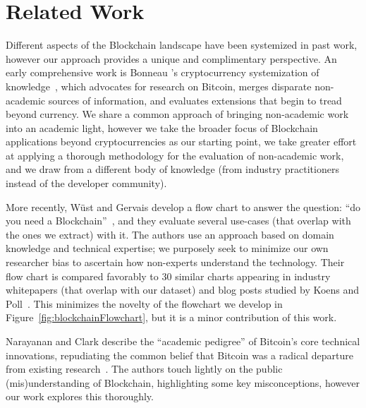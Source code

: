 
\section{Related Work}
\label{sec:related-works}

Different aspects of the Blockchain landscape have been systemized in past work, however our approach provides a unique and complimentary perspective. An early comprehensive work is Bonneau \etal's cryptocurrency systemization of knowledge~\cite{BMC+15}, which advocates for research on Bitcoin, merges disparate non-academic sources of information, and evaluates extensions that begin to tread beyond currency. We share a common approach of bringing non-academic work into an academic light, however we take the broader focus of Blockchain applications beyond cryptocurrencies as our starting point, we take greater effort at applying a thorough methodology for the evaluation of non-academic work, and we draw from a different body of knowledge (\ie from industry practitioners instead of the developer community).

More recently, W{\"u}st and Gervais develop a flow chart to answer the question: ``do you need a Blockchain''~\cite{Wust17}, and they evaluate several use-cases (that overlap with the ones we extract) with it. The authors use an approach based on domain knowledge and technical expertise; we purposely seek to minimize our own researcher bias to ascertain how non-experts understand the technology. Their flow chart is compared favorably to 30 similar charts appearing in industry whitepapers (that overlap with our dataset) and blog posts studied by Koens and Poll~\cite{koens2018blockchain}. This minimizes the novelty of the flowchart we develop in Figure~\ref{fig:blockchainFlowchart}, but it is a minor contribution of this work. 

Narayanan and Clark describe the ``academic pedigree'' of Bitcoin's core technical innovations, repudiating the common belief that Bitcoin was a radical departure from existing research~\cite{Narayanan17}. The authors touch lightly on the public (mis)understanding of Blockchain, highlighting some key misconceptions, however our work explores this thoroughly.


